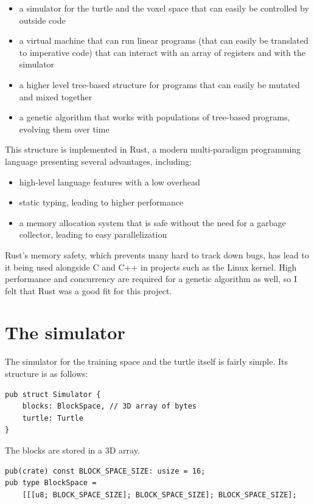 \documentclass{report}
\begin{document}
\begin{itemize}
    \item a simulator for the turtle and the voxel space that can easily be controlled by outside code
    \item a virtual machine that can run linear programs (that can easily be translated to imperative code) that can interact with an array of registers and with the simulator
    \item a higher level tree-based structure for programs that can easily be mutated and mixed together
    \item a genetic algorithm that works with populations of tree-based programs, evolving them over time
\end{itemize}

This structure is implemented in Rust, a modern multi-paradigm programming language presenting several advantages, including:
\begin{itemize}
    \item high-level language features with a low overhead
    \item static typing, leading to higher performance
    \item a memory allocation system that is safe without the need for a garbage collector, leading to easy parallelization
\end{itemize}
Rust's memory safety, which prevents many hard to track down bugs, has lead to it being used alongside C and C++ in projects such as the Linux kernel. High performance and concurrency are required for a genetic algorithm as well, so I felt that Rust was a good fit for this project.

\section{The simulator}
The simulator for the training space and the turtle itself is fairly simple. Its structure is as follows:

\begin{verbatim}
pub struct Simulator {
    blocks: BlockSpace, // 3D array of bytes
    turtle: Turtle
}
\end{verbatim}

The blocks are stored in a 3D array.

\begin{verbatim}
pub(crate) const BLOCK_SPACE_SIZE: usize = 16;
pub type BlockSpace = 
    [[[u8; BLOCK_SPACE_SIZE]; BLOCK_SPACE_SIZE]; BLOCK_SPACE_SIZE];
\end{verbatim}
\end{document}
